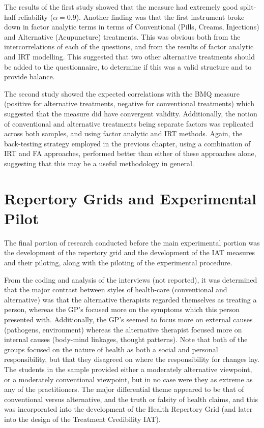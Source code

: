 The results of the first study showed that the measure had extremely
good split-half reliability ($ \alpha=0.9$). Another finding was that
the first instrument broke down in factor analytic terms in terms of
Conventional (Pills, Creams, Injections) and Alternative (Acupuncture)
treatments. This was obvious both from the intercorrelations of each
of the questions, and from the results of factor analytic and IRT
modelling. This suggested that two other alternative treatments should
be added to the questionnaire, to determine if this was a valid
structure and to provide balance.

The second study showed the expected correlations with the BMQ measure
(positive for alternative treatments, negative for conventional
treatments) which suggested that the measure did have convergent
validity. Additionally, the notion of conventional and alternative
treatments being separate factors was replicated across both samples,
and using factor analytic and IRT methods. Again, the back-testing
strategy employed in the previous chapter, using a combination of IRT
and FA approaches, performed better than either of these approaches
alone, suggesting that this may be a useful methodology in general.


\section{Repertory Grids and Experimental Pilot}
\label{sec:qual-rese-rep}

The final portion of research conducted before the main experimental
portion was the development of the repertory grid and the development
of the IAT measures and their piloting, along with the piloting of the
experimental procedure.

From the coding and analysis of the interviews (not reported), it was determined
that the major contrast between styles of health-care (conventional and
alternative) was that the alternative therapists regarded themselves
as treating a person, whereas the GP's focused more on the symptoms
which this person presented with. Additionally, the GP's seemed to
focus more on external causes (pathogens, environment) whereas the
alternative therapist focused more on internal causes (body-mind
linkages, thought patterns). Note that both of the groups focused on
the nature of health as both a social and personal responsibility, but
that they disagreed on where the responsibility for changes lay. The
students in the sample provided either a moderately alternative
viewpoint, or a moderately conventional viewpoint, but in no case were
they as extreme as any of the practitioners. The major differential
theme appeared to be that of conventional versus alternative, and the
truth or falsity of health claims, and this was incorporated into the
development of the Health Repertory Grid (and later into the design of
the Treatment Credibility IAT).

